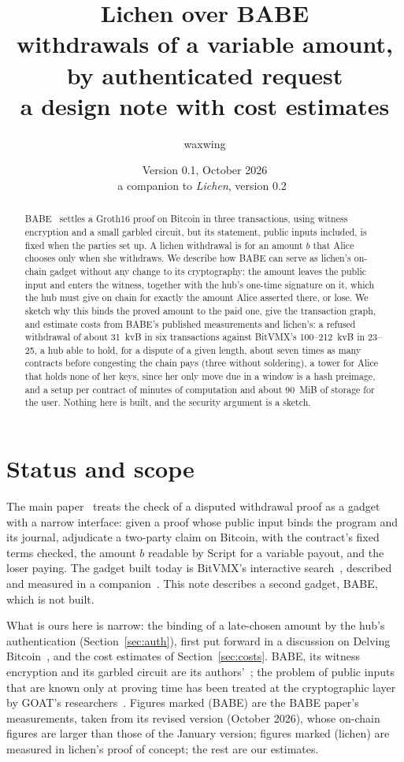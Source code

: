 \documentclass[11pt]{article}
\title{\textbf{Lichen over BABE}\\withdrawals of a variable amount, by authenticated request\\[2pt]\large a design note with cost estimates}
\author{waxwing}
\date{Version 0.1, October 2026\\[2pt]\small a companion to \emph{Lichen}, version 0.2~\cite{lichen}}
\begin{document}
\maketitle

\begin{abstract}
BABE~\cite{babe} settles a Groth16 proof on Bitcoin in three
transactions, using witness encryption and a small garbled circuit, but
its statement, public inputs included, is fixed when the parties set up.
A lichen withdrawal is for an amount $b$ that Alice chooses only when she
withdraws. We describe how BABE can serve as lichen's on-chain gadget
without any change to its cryptography: the amount leaves the public
input and enters the witness, together with the hub's one-time signature
on it, which the hub must give on chain for exactly the amount Alice
asserted there, or lose. We sketch why this binds the proved amount to
the paid one, give the transaction graph, and estimate costs from BABE's
published measurements and lichen's: a refused withdrawal of about
31~kvB in six transactions against BitVMX's 100--212~kvB in 23--25, a
hub able to hold, for a dispute of a given length, about seven times as
many contracts before congesting the chain pays (three without
soldering), a
tower for Alice that holds none of her keys, since her only move due in
a window is a hash preimage, and a
setup per contract of minutes of computation and about 90~MiB of storage
for the user. Nothing here is built, and the security argument is a
sketch.
\end{abstract}

\tableofcontents

\section{Status and scope}
\label{sec:status}

The main paper~\cite{lichen} treats the check of a disputed withdrawal
proof as a gadget with a narrow interface: given a proof whose public
input binds the program and its journal, adjudicate a two-party claim
on Bitcoin, with the contract's fixed terms checked, the amount $b$
readable by Script for a variable payout, and the loser paying. The
gadget built today is BitVMX's interactive search~\cite{bitvmx},
described and measured in a companion~\cite{lichenbitvmx}. This note
describes a second gadget, BABE, which is not built.

What is ours here is narrow: the binding of a late-chosen amount by the
hub's authentication (Section~\ref{sec:auth}), first put forward in a
discussion on Delving Bitcoin~\cite{delving}, and the cost estimates of
Section~\ref{sec:costs}. BABE, its witness encryption and its garbled
circuit are its authors'~\cite{babe,gkpw24,argo}; the problem of public
inputs that are known only at proving time has been treated at the
cryptographic layer by GOAT's researchers~\cite{goat}. Figures marked
(BABE) are the BABE paper's measurements, taken from its revised version
(October 2026), whose on-chain figures are larger than those of the
January version; figures marked (lichen) are measured in lichen's proof
of concept; the rest are our estimates.
\end{document}
